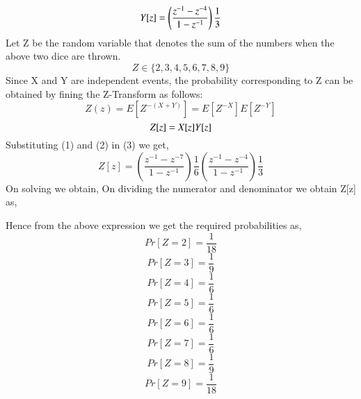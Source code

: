 \documentclass[journal,12pt,twocolumn]{IEEEtran}
\begin{document}
\begin{equation}
\boldmath{Y[z]=\left(\frac{z^{-1}-z^{-4}}{1-z^{-1}}\right)\frac{1}{3}}
\end{equation}
\newline
Let Z be the random variable that denotes the sum of the numbers when the above two dice are thrown.\[ Z \in \{2,3,4,5,6,7,8,9\} \] Since X and Y are independent events, the probability corresponding to Z can be obtained by fining the Z-Transform as follows:
\[Z(z)=E[Z^{-(X+Y)}]=E[Z^{-X}]E[Z^{-Y}] \]
\begin{equation}
   \boldmath{Z[z] = X[z]Y[z]}
\end{equation}
Substituting (1) and (2) in (3) we get,
\[ Z[z]= \left(\frac{z^{-1}-z^{-7}}{1-z^{-1}}\right)\frac{1}{6} \left(\frac{z^{-1}-z^{-4}}{1-z^{-1}}\right)\frac{1}{3}
\]
On solving we obtain,
\boldmath{\[ Z[z]=\left( \frac{z^{-11}-z^{-8}-z^{-5}+z^{-2}}{z^{-2}-2z^{-1}+1}\right)\frac{1}{18} \]}
On dividing the numerator and denominator we obtain Z[z] as,
{}


Hence from the above expression we get the required probabilities as,
\[ Pr[Z=2] = \frac{1}{18} \]
\[ Pr[Z=3] = \frac{1}{9} \]
\[ Pr[Z=4] = \frac{1}{6} \]
\[ Pr[Z=5] = \frac{1}{6} \]
\[ Pr[Z=6] = \frac{1}{6} \]
\[ Pr[Z=7] = \frac{1}{6} \]
\[ Pr[Z=8] = \frac{1}{9} \]
\[ Pr[Z=9] = \frac{1}{18} \]
\end{document}

